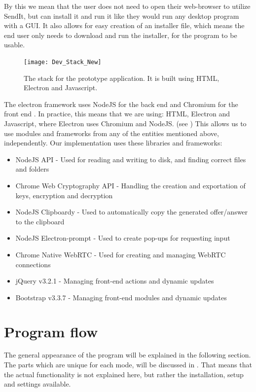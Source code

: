 		By this we mean that the user does not need to open their web-browser to utilize SendIt, but can install it and run it like they would run any desktop program with a GUI. It also allows for easy creation of an installer file, which means the end user only needs to download and run the installer, for the program to be usable.

		\begin{figure}
		\centering
		\texttt{[image: Dev\_Stack\_New]}
		\caption[Application stack]{The stack for the prototype application. It is built using HTML, Electron and Javascript.}
		\label{fig:dev_stack}
		\end{figure}

		The electron framework uses NodeJS for the back end and Chromium for the front end \cite{url_electron}. In practice, this means that we are using: HTML, Electron and Javascript, where Electron uses Chromium and NodeJS. (see ) This allows us to use modules and frameworks from any of the entities mentioned above, independently. Our implementation uses these libraries and frameworks:
		\begin{itemize}
		\item NodeJS API - Used for reading and writing to disk, and finding correct files and folders \cite{url_node}
		\item Chrome Web Cryptography API - Handling the creation and exportation of keys, encryption and decryption \cite{ar_webcrypto,url_webcr_supp}
		\item NodeJS Clipboardy - Used to automatically copy the generated offer/answer to the clipboard \cite{url_clipboardy}
		\item NodeJS Electron-prompt - Used to create pop-ups for requesting input \cite{url_ele-prompt}
		\item Chrome Native WebRTC - Used for creating and managing WebRTC connections \cite{url_webrtc_chrome}
		\item jQuery v3.2.1 - Managing front-end actions and dynamic updates \cite{url_jQuery}
		\item Bootstrap v3.3.7 - Managing front-end modules and dynamic updates \cite{url_bootstrap}
		\end{itemize}

%
\section{Program flow}
\label{sec:progflow}
The general appearance of the program will be explained in the following section. The parts which are unique for each mode, will be discussed in . That means that the actual functionality is not explained here, but rather the installation, setup and settings available.
%
